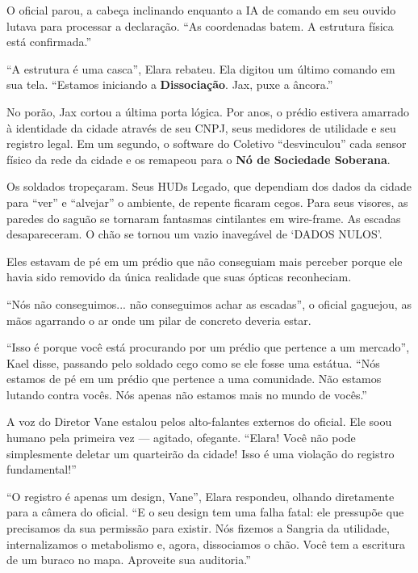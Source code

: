 O oficial parou, a cabeça inclinando enquanto a IA de comando em seu ouvido lutava para processar a declaração. ``As coordenadas batem. A estrutura física está confirmada.''

``A estrutura é uma casca'', Elara rebateu. Ela digitou um último comando em sua tela. ``Estamos iniciando a \textbf{Dissociação}. Jax, puxe a âncora.''

No porão, Jax cortou a última porta lógica. Por anos, o prédio estivera amarrado à identidade da cidade através de seu CNPJ, seus medidores de utilidade e seu registro legal. Em um segundo, o software do Coletivo ``desvinculou'' cada sensor físico da rede da cidade e os remapeou para o \textbf{Nó de Sociedade Soberana}.


Os soldados tropeçaram. Seus HUDs Legado, que dependiam dos dados da cidade para ``ver'' e ``alvejar'' o ambiente, de repente ficaram cegos. Para seus visores, as paredes do saguão se tornaram fantasmas cintilantes em wire-frame. As escadas desapareceram. O chão se tornou um vazio inavegável de `DADOS NULOS'.

Eles estavam de pé em um prédio que não conseguiam mais perceber porque ele havia sido removido da única realidade que suas ópticas reconheciam.

``Nós não conseguimos... não conseguimos achar as escadas'', o oficial gaguejou, as mãos agarrando o ar onde um pilar de concreto deveria estar.

``Isso é porque você está procurando por um prédio que pertence a um mercado'', Kael disse, passando pelo soldado cego como se ele fosse uma estátua. ``Nós estamos de pé em um prédio que pertence a uma comunidade. Não estamos lutando contra vocês. Nós apenas não estamos mais no mundo de vocês.''

A voz do Diretor Vane estalou pelos alto-falantes externos do oficial. Ele soou humano pela primeira vez --- agitado, ofegante. ``Elara! Você não pode simplesmente deletar um quarteirão da cidade! Isso é uma violação do registro fundamental!''

``O registro é apenas um design, Vane'', Elara respondeu, olhando diretamente para a câmera do oficial. ``E o seu design tem uma falha fatal: ele pressupõe que precisamos da sua permissão para existir. Nós fizemos a Sangria da utilidade, internalizamos o metabolismo e, agora, dissociamos o chão. Você tem a escritura de um buraco no mapa. Aproveite sua auditoria.''

